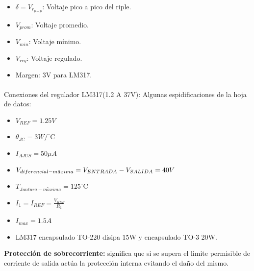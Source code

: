 \begin{itemize}
    \item $\delta =V_{r_{p-p}}$: Voltaje pico a pico del riple.
    \item $V_{prom}$: Voltaje promedio.
    \item $V_{min}$: Voltaje mínimo.
    \item $V_{reg}$: Voltaje regulado.
    \item Margen: 3V para LM317.
\end{itemize}


\paragraph{} Conexiones del regulador LM317(1.2 A 37V):
\vspace{0.5cm}
\sangria{} Algunas espidificaciones de la hoja de datos:


\begin{itemize}
    \item $V_{REF}=1.25V$
    \item $\theta_{JC} = 3 W/ ^\circ\mathrm{C} $
    \item $I_{AJUS} = 50\mu A$
    \item $V_{diferencial-m \tilde{a} xima}=\\V_{ENTRADA}-V_{SALIDA}=40V$
    \item $T_{Juntura-m\tilde{a}xima}=125 ^\circ\mathrm{C}$
    \item $I_1=I_{REF}=\frac{V_{REF}}{R_1}$
    \item $I_{max}=1.5A$
    \item LM317 encapsulado TO-220 disipa 15W y encapsulado TO-3 20W.
\end{itemize}

\sangria{} \textbf{Protección de sobrecorriente:} significa que si se supera el limite permisible de corriente de salida actúa la protección interna evitando el daño del mismo.

